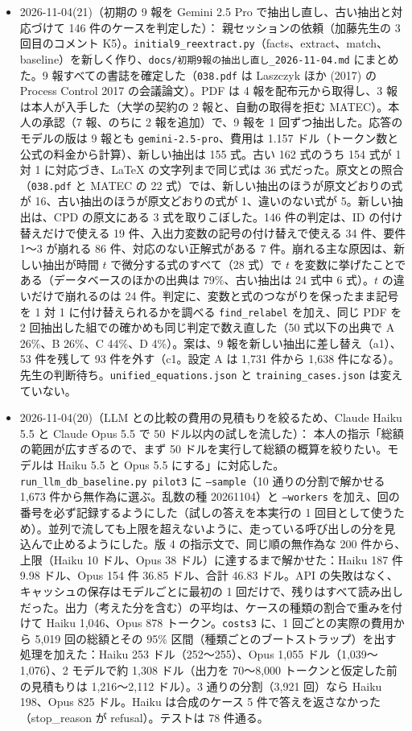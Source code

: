 \documentclass[11pt,a4paper]{jsarticle}
\begin{document}
\begin{itemize}[nosep]
  \item 2026-11-04(21)（初期の 9 報を Gemini 2.5 Pro で抽出し直し、古い抽出と対応づけて 146 件のケースを判定した）：
    親セッションの依頼（加藤先生の 3 回目のコメント K5）。\texttt{initial9\_reextract.py}（facts、extract、match、baseline）を新しく作り、\texttt{docs/初期9報の抽出し直し\_2026-11-04.md} にまとめた。9 報すべての書誌を確定した（\texttt{038.pdf} は Laszczyk ほか (2017) の Process Control 2017 の会議論文）。PDF は 4 報を配布元から取得し、3 報は本人が入手した（大学の契約の 2 報と、自動の取得を拒む MATEC）。本人の承認（7 報、のちに 2 報を追加）で、9 報を 1 回ずつ抽出した。応答のモデルの版は 9 報とも \texttt{gemini-2.5-pro}、費用は 1.157 ドル（トークン数と公式の料金から計算）、新しい抽出は 155 式。古い 162 式のうち 154 式が 1 対 1 に対応づき、LaTeX の文字列まで同じ式は 36 式だった。原文との照合（\texttt{038.pdf} と MATEC の 22 式）では、新しい抽出のほうが原文どおりの式が 16、古い抽出のほうが原文どおりの式が 1、違いのない式が 5。新しい抽出は、CPD の原文にある 3 式を取りこぼした。146 件の判定は、ID の付け替えだけで使える 19 件、入出力変数の記号の付け替えで使える 34 件、要件 1〜3 が崩れる 86 件、対応のない正解式がある 7 件。崩れる主な原因は、新しい抽出が時間 $t$ で微分する式のすべて（28 式）で $t$ を変数に挙げたことである（データベースのほかの出典は 79\%、古い抽出は 24 式中 6 式）。$t$ の違いだけで崩れるのは 24 件。判定に、変数と式のつながりを保ったまま記号を 1 対 1 に付け替えられるかを調べる \texttt{find\_relabel} を加え、同じ PDF を 2 回抽出した組での確かめも同じ判定で数え直した（50 式以下の出典で A 26\%、B 26\%、C 44\%、D 4\%）。案は、9 報を新しい抽出に差し替え（a1）、53 件を残して 93 件を外す（c1。設定 A は 1,731 件から 1,638 件になる）。先生の判断待ち。\texttt{unified\_equations.json} と \texttt{training\_cases.json} は変えていない。
  \item 2026-11-04(20)（LLM との比較の費用の見積もりを絞るため、Claude Haiku 5.5 と Claude Opus 5.5 で 50 ドル以内の試しを流した）：
    本人の指示「総額の範囲が広すぎるので、まず 50 ドルを実行して総額の概算を絞りたい。モデルは Haiku 5.5 と Opus 5.5 にする」に対応した。\texttt{run\_llm\_db\_baseline.py pilot3} に \texttt{--sample}（10 通りの分割で解かせる 1,673 件から無作為に選ぶ。乱数の種 20261104）と \texttt{--workers} を加え、回の番号を必ず記録するようにした（試しの答えを本実行の 1 回目として使うため）。並列で流しても上限を超えないように、走っている呼び出しの分を見込んで止めるようにした。版 4 の指示文で、同じ順の無作為な 200 件から、上限（Haiku 10 ドル、Opus 38 ドル）に達するまで解かせた：Haiku 187 件 9.98 ドル、Opus 154 件 36.85 ドル、合計 46.83 ドル。API の失敗はなく、キャッシュの保存はモデルごとに最初の 1 回だけで、残りはすべて読み出しだった。出力（考えた分を含む）の平均は、ケースの種類の割合で重みを付けて Haiku 1,046、Opus 878 トークン。\texttt{costs3} に、1 回ごとの実際の費用から 5,019 回の総額とその 95\% 区間（種類ごとのブートストラップ）を出す処理を加えた：Haiku 253 ドル（252〜255）、Opus 1,055 ドル（1,039〜1,076）、2 モデルで約 1,308 ドル（出力を 70〜8,000 トークンと仮定した前の見積もりは 1,216〜2,112 ドル）。3 通りの分割（3,921 回）なら Haiku 198、Opus 825 ドル。Haiku は合成のケース 5 件で答えを返さなかった（stop\_reason が refusal）。テストは 78 件通る。

\end{itemize}
\end{document}
